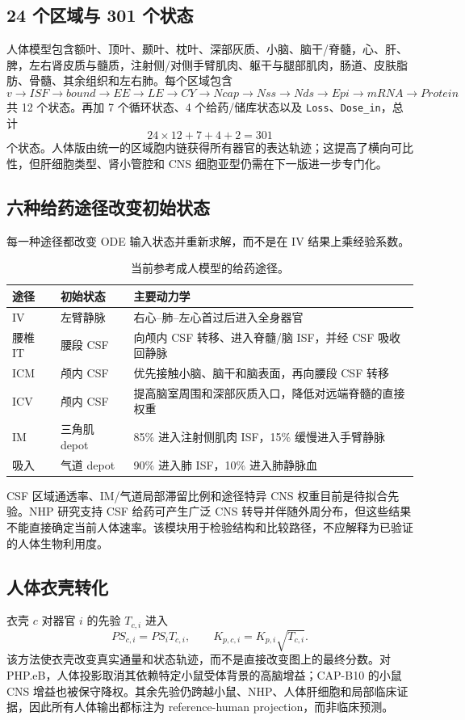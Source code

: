 \documentclass[UTF8,11pt,a4paper]{ctexart}
\newcommand{\code}[1]{\texttt{#1}}
\begin{document}
\subsection{24 个区域与 301 个状态}
人体模型包含额叶、顶叶、颞叶、枕叶、深部灰质、小脑、脑干/脊髓，心、肝、脾，左右肾皮质与髓质，注射侧/对侧手臂肌肉、躯干与腿部肌肉，肠道、皮肤脂肪、骨髓、其余组织和左右肺。每个区域包含
\[
v\to ISF\to bound\to EE\to LE\to CY\to Ncap\to Nss\to Nds\to Epi\to mRNA\to Protein
\]
共 12 个状态。再加 7 个循环状态、4 个给药/储库状态以及 \code{Loss}、\code{Dose\_in}，总计
\begin{equation}
24\times12+7+4+2=301
\end{equation}
个状态。人体版由统一的区域胞内链获得所有器官的表达轨迹；这提高了横向可比性，但肝细胞类型、肾小管腔和 CNS 细胞亚型仍需在下一版进一步专门化。

\subsection{六种给药途径改变初始状态}
每一种途径都改变 ODE 输入状态并重新求解，而不是在 IV 结果上乘经验系数。
\begin{table}[H]
\centering
\caption{当前参考成人模型的给药途径。}
\begin{tabularx}{\textwidth}{p{}p{}X}
\toprule
途径 & 初始状态 & 主要动力学 \\
\midrule
IV & 左臂静脉 & 右心--肺--左心首过后进入全身器官 \\
腰椎 IT & 腰段 CSF & 向颅内 CSF 转移、进入脊髓/脑 ISF，并经 CSF 吸收回静脉 \\
ICM & 颅内 CSF & 优先接触小脑、脑干和脑表面，再向腰段 CSF 转移 \\
ICV & 颅内 CSF & 提高脑室周围和深部灰质入口，降低对远端脊髓的直接权重 \\
IM & 三角肌 depot & 85\% 进入注射侧肌肉 ISF，15\% 缓慢进入手臂静脉 \\
吸入 & 气道 depot & 90\% 进入肺 ISF，10\% 进入肺静脉血 \\
\bottomrule
\end{tabularx}
\end{table}
CSF 区域通透率、IM/气道局部滞留比例和途径特异 CNS 权重目前是待拟合先验。NHP 研究支持 CSF 给药可产生广泛 CNS 转导并伴随外周分布\cite{gray2013,csfpet2023}，但这些结果不能直接确定当前人体速率。该模块用于检验结构和比较路径，不应解释为已验证的人体生物利用度。

\subsection{人体衣壳转化}
衣壳 $c$ 对器官 $i$ 的先验 $T_{c,i}$ 进入
\begin{equation}
PS_{c,i}=PS_iT_{c,i},\qquad K_{p,c,i}=K_{p,i}\sqrt{T_{c,i}}.
\end{equation}
该方法使衣壳改变真实通量和状态轨迹，而不是直接改变图上的最终分数。对 PHP.eB，人体投影取消其依赖特定小鼠受体背景的高脑增益；CAP-B10 的小鼠 CNS 增益也被保守降权。其余先验仍跨越小鼠、NHP、人体肝细胞和局部临床证据，因此所有人体输出都标注为 reference-human projection，而非临床预测。
\end{document}
